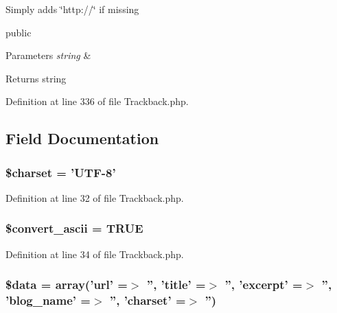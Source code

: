 Simply adds \char`\"{}http\-://\char`\"{} if missing

public 
\begin{DoxyParams}{Parameters}
{\em string} & \\
\hline
\end{DoxyParams}
\begin{DoxyReturn}{Returns}
string 
\end{DoxyReturn}


Definition at line 336 of file Trackback.\-php.



\subsection{Field Documentation}
\subsubsection[{\$charset}]{\setlength{\rightskip}{0pt plus 5cm}\$charset = 'U\-T\-F-\/8'}\label{class_c_i___trackback_af10158dd74b75f1d337e83102d6b82ce}


Definition at line 32 of file Trackback.\-php.

\subsubsection[{\$convert\-\_\-ascii}]{\setlength{\rightskip}{0pt plus 5cm}\${\bf convert\-\_\-ascii} = T\-R\-U\-E}\label{class_c_i___trackback_a488490c694dfefb9578fb22e0208e008}


Definition at line 34 of file Trackback.\-php.

\subsubsection[{\$data}]{\setlength{\rightskip}{0pt plus 5cm}\${\bf data} = array('url' =$>$ '', 'title' =$>$ '', 'excerpt' =$>$ '', 'blog\-\_\-name' =$>$ '', 'charset' =$>$ '')}\label{class_c_i___trackback_a6efc15b5a2314dd4b5aaa556a375c6d6}



